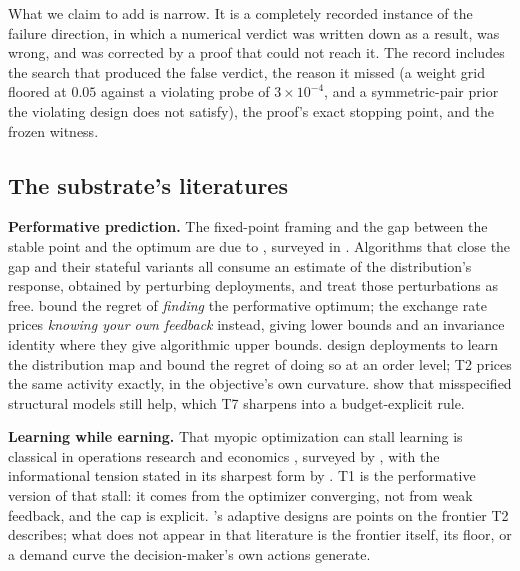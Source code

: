 What we claim to add is narrow. It is a completely recorded instance of the
failure direction, in which a numerical verdict was written down as a result,
was wrong, and was corrected by a proof that could not reach it. The record
includes the search that produced the false verdict, the reason it missed
(a weight grid floored at $0.05$ against a violating probe of
$3 \times 10^{-4}$, and a symmetric-pair prior the violating design does not
satisfy), the proof's exact stopping point, and the frozen witness.

\subsection{The substrate's literatures}

\textbf{Performative prediction.} The fixed-point framing and the gap between
the stable point and the optimum are due to \citet{perdomo2020performative},
surveyed in \citet{hardt2023performative}. Algorithms that close the gap
\citep{izzo2021learn,miller2021outside,mendler2020stochastic,drusvyatskiy2022stochastic}
and their stateful variants \citep{brown2022performative,li2022state} all
consume an estimate of the distribution's response, obtained by perturbing
deployments, and treat those perturbations as free.
\citet{jagadeesan2022regret} bound the regret of \emph{finding} the
performative optimum; the exchange rate prices \emph{knowing your own
feedback} instead, giving lower bounds and an invariance identity where they
give algorithmic upper bounds. \citet{bracale2025reverse} design deployments
to learn the distribution map and bound the regret of doing so at an order
level; T2 prices the same activity exactly, in the objective's own curvature.
\citet{lin2024plugin} show that misspecified structural models still help,
which T7 sharpens into a budget-explicit rule.

\textbf{Learning while earning.} That myopic optimization can stall learning is
classical in operations research and economics
\citep{rothschild1974two,easley1988controlling,aghion1991optimal,harrison2012bayesian,broder2012dynamic,keskin2014dynamic},
surveyed by \citet{denboer2015dynamic}, with the informational tension stated
in its sharpest form by \citet{grossman1980impossibility}. T1 is the
performative version of that stall: it comes from the optimizer converging,
not from weak feedback, and the cap is explicit. \citet{lai1979adaptive}'s
adaptive designs are points on the frontier T2 describes; what does not appear
in that literature is the frontier itself, its floor, or a demand curve the
decision-maker's own actions generate.

